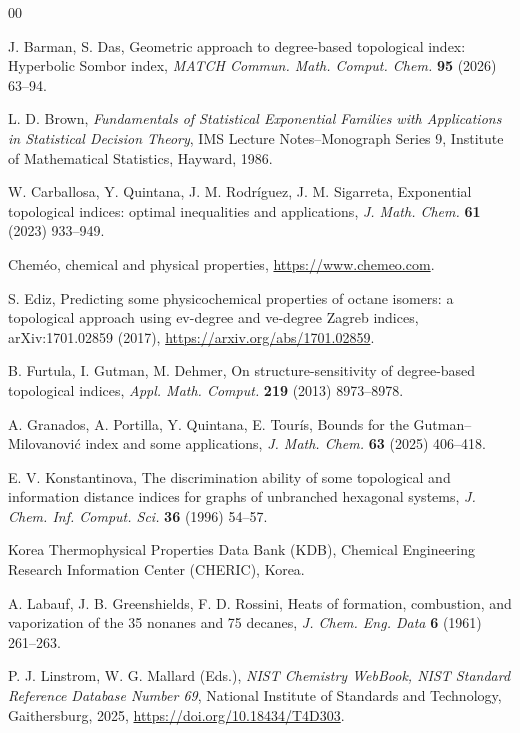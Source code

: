 \documentclass[a5paper, 10pt]{article}
\theoremstyle{plain}
\theoremstyle{remark}
\theoremstyle{definition}
\begin{document}
\singlespacing
\begin{thebibliography}{00}

   J. Barman, S. Das, Geometric approach to
  degree-based topological index: Hyperbolic Sombor index, \textit{MATCH
  Commun. Math. Comput. Chem.\/} \textbf{95} (2026) 63--94.

   L. D. Brown, \textit{Fundamentals of Statistical
  Exponential Families with Applications in Statistical Decision
  Theory\/}, IMS Lecture Notes--Monograph Series 9, Institute of
  Mathematical Statistics, Hayward, 1986.

   W. Carballosa, Y. Quintana,
  J. M. Rodr\'iguez, J. M. Sigarreta, Exponential topological indices: optimal
  inequalities and applications, \textit{J. Math. Chem.\/} \textbf{61} (2023) 933--949.

   Chem\'eo, chemical and physical properties,
  \url{https://www.chemeo.com}.

  S. Ediz, Predicting some physicochemical properties of octane isomers:
  a topological approach using ev-degree and ve-degree Zagreb indices,
  arXiv:1701.02859 (2017), \url{https://arxiv.org/abs/1701.02859}.

   B. Furtula, I. Gutman, M. Dehmer, On
  structure-sensitivity of degree-based topological indices, \textit{Appl.
  Math. Comput.\/} \textbf{219} (2013) 8973--8978.

   A. Granados, A. Portilla, Y. Quintana,
  E. Tour\'is, Bounds for the Gutman--Milovanovi\'c index and some
  applications, \textit{J. Math. Chem.\/} \textbf{63} (2025)
  406--418.

   E. V. Konstantinova, The
  discrimination ability of some topological and information distance indices
  for graphs of unbranched hexagonal systems, \textit{J. Chem. Inf. Comput.
  Sci.\/} \textbf{36} (1996) 54--57.

   Korea Thermophysical Properties Data Bank (KDB), Chemical
  Engineering Research Information Center (CHERIC), Korea.

   A. Labauf, J. B. Greenshields,
  F. D. Rossini, Heats of formation, combustion, and vaporization of the
  35 nonanes and 75 decanes, \textit{J. Chem. Eng. Data\/} \textbf{6}
  (1961) 261--263.

   P. J. Linstrom, W. G. Mallard (Eds.), \textit{NIST
  Chemistry WebBook, NIST Standard Reference Database Number 69\/}, National
  Institute of Standards and Technology, Gaithersburg, 2025,
  \url{https://doi.org/10.18434/T4D303}.


\end{thebibliography}
\end{document}
